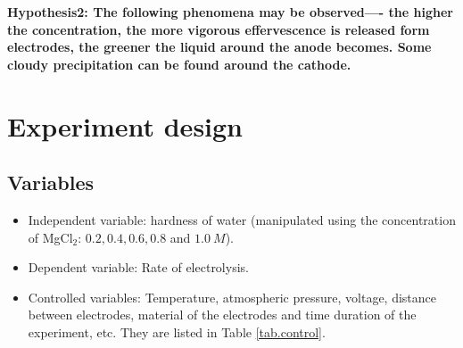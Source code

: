 \documentclass[a4paper]{article}
\begin{document}
\textbf{Hypothesis2: The following phenomena may be observed---- the higher the concentration, the more vigorous effervescence is released form electrodes, the greener the liquid around the anode becomes. Some cloudy precipitation can be found around the cathode.}

\section{Experiment design}

\subsection{Variables} 

\begin{itemize}
    \item Independent variable: hardness of water (manipulated using the concentration of MgCl$_2$: $0.2, 0.4, 0.6, 0.8$ and $ 1.0\SI{}{M}$).
    \item Dependent variable: Rate of electrolysis.
    \item Controlled variables: Temperature, atmospheric pressure, voltage, distance between electrodes, material of the electrodes and time duration of the experiment, etc. They are listed in Table \ref{tab.control}.
\end{itemize}
\end{document}
